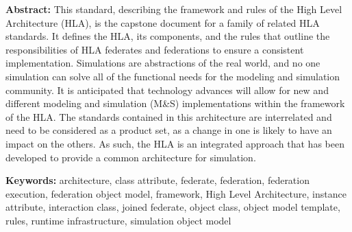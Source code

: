\thispagestyle{hlafrontlicense}
\begingroup
\setlength{\parindent}{0pt}
\setlength{\parskip}{0pt}
\vspace*{13.35pt}
{\frontBodySans\justifying
\textbf{Abstract:} This standard, describing the framework and rules of the High Level Architecture (HLA),\linebreak
is the capstone document for a family of related HLA standards. It defines the HLA, its\linebreak
components, and the rules that outline the responsibilities of HLA federates and federations to\linebreak
ensure a consistent implementation. Simulations are abstractions of the real world, and no one\linebreak
simulation can solve all of the functional needs for the modeling and simulation community. It is\linebreak
anticipated that technology advances will allow for new and different modeling and simulation\linebreak
(M\&S) implementations within the framework of the HLA. The standards contained in this\linebreak
architecture are interrelated and need to be considered as a product set, as a change in one is likely\linebreak
to have an impact on the others. As such, the HLA is an integrated approach that has been\linebreak
developed to provide a common architecture for simulation.\par
\textbf{Keywords:} architecture, class attribute, federate, federation, federation execution, federation\linebreak
object model, framework, High Level Architecture, instance attribute, interaction class, joined\linebreak
federate, object class, object model template, rules, runtime infrastructure, simulation object model\par

\vspace{14.17pt}
\endgroup
\clearpage

